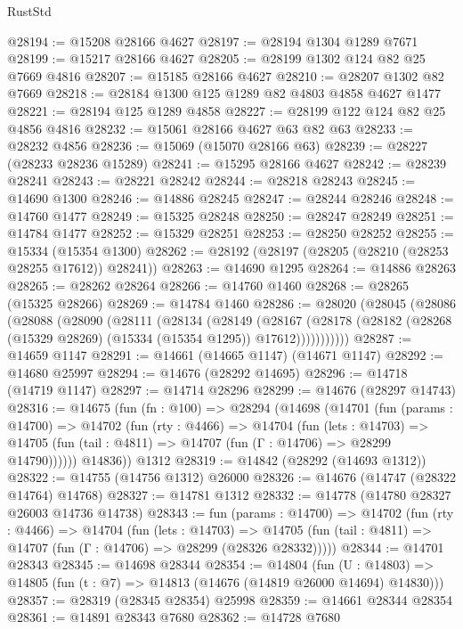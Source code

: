 \begin{lexlean}{RustStd}
\begin{coremodule}
@28194 := @15208 @28166 @4627
@28197 := @28194 @1304 @1289 @7671
@28199 := @15217 @28166 @4627
@28205 := @28199 @1302 @124 @82 @25 @7669 @4816
@28207 := @15185 @28166 @4627
@28210 := @28207 @1302 @82 @7669
@28218 := @28184 @1300 @125 @1289 @82 @4803 @4858 @4627 @1477
@28221 := @28194 @125 @1289 @4858
@28227 := @28199 @122 @124 @82 @25 @4856 @4816
@28232 := @15061 @28166 @4627 @63 @82 @63
@28233 := @28232 @4856
@28236 := @15069 (@15070 @28166 @63)
@28239 := @28227 (@28233 @28236 @15289)
@28241 := @15295 @28166 @4627
@28242 := @28239 @28241
@28243 := @28221 @28242
@28244 := @28218 @28243
@28245 := @14690 @1300
@28246 := @14886 @28245
@28247 := @28244 @28246
@28248 := @14760 @1477
@28249 := @15325 @28248
@28250 := @28247 @28249
@28251 := @14784 @1477
@28252 := @15329 @28251
@28253 := @28250 @28252
@28255 := @15334 (@15354 @1300)
@28262 := @28192 (@28197 (@28205 (@28210 (@28253 @28255 @17612)) @28241))
@28263 := @14690 @1295
@28264 := @14886 @28263
@28265 := @28262 @28264
@28266 := @14760 @1460
@28268 := @28265 (@15325 @28266)
@28269 := @14784 @1460
@28286 := @28020
    (@28045
      (@28086
        (@28088
          (@28090
            (@28111
              (@28134
                (@28149
                  (@28167
                    (@28178
                      (@28182 (@28268 (@15329 @28269) (@15334 (@15354 @1295)) @17612)))))))))))
@28287 := @14659 @1147
@28291 := @14661 (@14665 @1147) (@14671 @1147)
@28292 := @14680 @25997
@28294 := @14676 (@28292 @14695)
@28296 := @14718 (@14719 @1147)
@28297 := @14714 @28296
@28299 := @14676 (@28297 @14743)
@28316 := @14675
    (fun (fn : @100) =>
    @28294
      (@14698
        (@14701
          (fun (params : @14700) =>
          @14702
            (fun (rty : @4466) =>
            @14704
              (fun (lets : @14703) =>
              @14705 (fun (tail : @4811) => @14707 (fun (Γ : @14706) => @28299 @14790))))))
        @14836))
    @1312
@28319 := @14842 (@28292 (@14693 @1312))
@28322 := @14755 (@14756 @1312) @26000
@28326 := @14676 (@14747 (@28322 @14764) @14768)
@28327 := @14781 @1312
@28332 := @14778 (@14780 @28327 @26003 @14736 @14738)
@28343 := fun (params : @14700) =>
  @14702
    (fun (rty : @4466) =>
    @14704
      (fun (lets : @14703) =>
      @14705 (fun (tail : @4811) => @14707 (fun (Γ : @14706) => @28299 (@28326 @28332)))))
@28344 := @14701 @28343
@28345 := @14698 @28344
@28354 := @14804
    (fun (U : @14803) => @14805 (fun (t : @7) => @14813 (@14676 (@14819 @26000 @14694) @14830)))
@28357 := @28319 (@28345 @28354) @25998
@28359 := @14661 @28344 @28354
@28361 := @14891 @28343 @7680
@28362 := @14728 @7680

\end{coremodule}
\end{lexlean}
